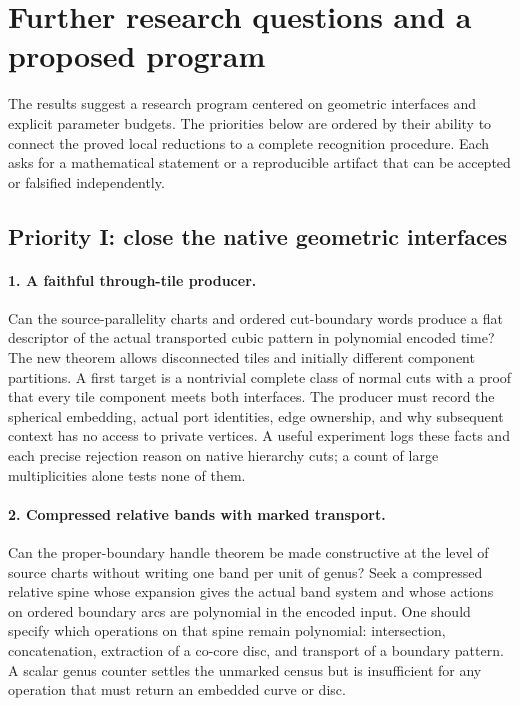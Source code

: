 \section{Further research questions and a proposed program}
\label{sec:research-program}

The results suggest a research program centered on geometric interfaces and
explicit parameter budgets. The priorities below are ordered by their ability
to connect the proved local reductions to a complete recognition procedure.
Each asks for a mathematical statement or a reproducible artifact that can be
accepted or falsified independently.

\subsection{Priority I: close the native geometric interfaces}

\paragraph{1. A faithful through-tile producer.}
Can the source-parallelity charts and ordered cut-boundary words produce a
flat descriptor of the actual transported cubic pattern in polynomial encoded
time? The new theorem allows disconnected tiles and initially different
component partitions. A first target is a nontrivial complete class of normal
cuts with a proof that every tile component meets both interfaces. The producer
must record the spherical embedding, actual port identities, edge ownership,
and why subsequent context has no access to private vertices. A useful
experiment logs these facts and each precise rejection reason on native
hierarchy cuts; a count of large multiplicities alone tests none of them.

\paragraph{2. Compressed relative bands with marked transport.}
Can the proper-boundary handle theorem be made constructive at the level of
source charts without writing one band per unit of genus? Seek a compressed
relative spine whose expansion gives the actual band system and whose actions
on ordered boundary arcs are polynomial in the encoded input. One should
specify which operations on that spine remain polynomial: intersection,
concatenation, extraction of a co-core disc, and transport of a boundary
pattern. A scalar genus counter settles the unmarked census but is insufficient
for any operation that must return an embedded curve or disc.

